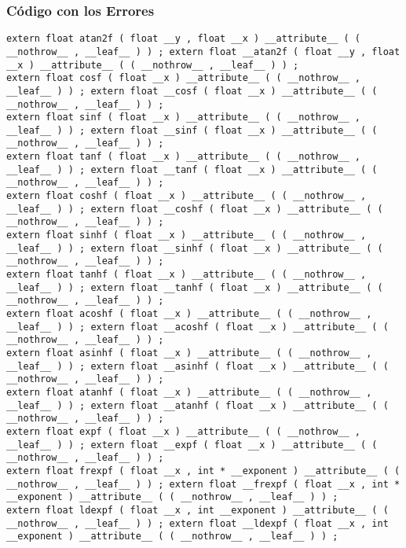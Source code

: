 \documentclass{beamer}
\begin{document}
\begin{frame}[fragile]
\frametitle{C\'odigo con los Errores}
\begin{verbatim}
extern float atan2f ( float __y , float __x ) __attribute__ ( ( __nothrow__ , __leaf__ ) ) ; extern float __atan2f ( float __y , float __x ) __attribute__ ( ( __nothrow__ , __leaf__ ) ) ; 
extern float cosf ( float __x ) __attribute__ ( ( __nothrow__ , __leaf__ ) ) ; extern float __cosf ( float __x ) __attribute__ ( ( __nothrow__ , __leaf__ ) ) ; 
extern float sinf ( float __x ) __attribute__ ( ( __nothrow__ , __leaf__ ) ) ; extern float __sinf ( float __x ) __attribute__ ( ( __nothrow__ , __leaf__ ) ) ; 
extern float tanf ( float __x ) __attribute__ ( ( __nothrow__ , __leaf__ ) ) ; extern float __tanf ( float __x ) __attribute__ ( ( __nothrow__ , __leaf__ ) ) ; 
extern float coshf ( float __x ) __attribute__ ( ( __nothrow__ , __leaf__ ) ) ; extern float __coshf ( float __x ) __attribute__ ( ( __nothrow__ , __leaf__ ) ) ; 
extern float sinhf ( float __x ) __attribute__ ( ( __nothrow__ , __leaf__ ) ) ; extern float __sinhf ( float __x ) __attribute__ ( ( __nothrow__ , __leaf__ ) ) ; 
extern float tanhf ( float __x ) __attribute__ ( ( __nothrow__ , __leaf__ ) ) ; extern float __tanhf ( float __x ) __attribute__ ( ( __nothrow__ , __leaf__ ) ) ; 
extern float acoshf ( float __x ) __attribute__ ( ( __nothrow__ , __leaf__ ) ) ; extern float __acoshf ( float __x ) __attribute__ ( ( __nothrow__ , __leaf__ ) ) ; 
extern float asinhf ( float __x ) __attribute__ ( ( __nothrow__ , __leaf__ ) ) ; extern float __asinhf ( float __x ) __attribute__ ( ( __nothrow__ , __leaf__ ) ) ; 
extern float atanhf ( float __x ) __attribute__ ( ( __nothrow__ , __leaf__ ) ) ; extern float __atanhf ( float __x ) __attribute__ ( ( __nothrow__ , __leaf__ ) ) ; 
extern float expf ( float __x ) __attribute__ ( ( __nothrow__ , __leaf__ ) ) ; extern float __expf ( float __x ) __attribute__ ( ( __nothrow__ , __leaf__ ) ) ; 
extern float frexpf ( float __x , int * __exponent ) __attribute__ ( ( __nothrow__ , __leaf__ ) ) ; extern float __frexpf ( float __x , int * __exponent ) __attribute__ ( ( __nothrow__ , __leaf__ ) ) ; 
extern float ldexpf ( float __x , int __exponent ) __attribute__ ( ( __nothrow__ , __leaf__ ) ) ; extern float __ldexpf ( float __x , int __exponent ) __attribute__ ( ( __nothrow__ , __leaf__ ) ) ; 
\end{verbatim}
\end{frame}
\end{document}
